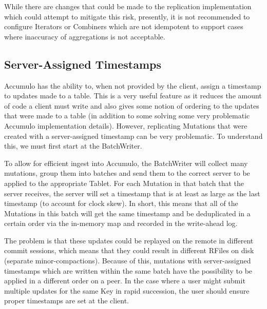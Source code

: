 While there are changes that could be made to the replication implementation which could attempt to mitigate this risk,
presently, it is not recommended to configure Iterators or Combiners which are not idempotent to support cases where
inaccuracy of aggregations is not acceptable.

\subsection{Server-Assigned Timestamps}

Accumulo has the ability to, when not provided by the client, assign a timestamp to updates made to a table. This is a
very useful feature as it reduces the amount of code a client must write and also gives some notion of ordering to the
updates that were made to a table (in addition to some solving some very problematic Accumulo implementation details).
However, replicating Mutations that were created with a server-assigned timestamp can be very problematic. To understand
this, we must first start at the BatchWriter.

To allow for efficient ingest into Accumulo, the BatchWriter will collect many mutations, group them into batches and
send them to the correct server to be applied to the appropriate Tablet. For each Mutation in that batch that the server
receives, the server will set a timestamp that is at least as large as the last timestamp (to account for clock skew). In short,
this means that all of the Mutations in this batch will get the same timestamp and be deduplicated in a certain order
via the in-memory map and recorded in the write-ahead log.

The problem is that these updates could be replayed on the remote in different commit sessions, which means that they
could result in different RFiles on disk (separate minor-compactions). Because of this, mutations with server-assigned
timestamps which are written within the same batch have the possibility to be applied in a different order on a peer. In
the case where a user might submit multiple updates for the same Key in rapid succession, the user should ensure proper
timestamps are set at the client.
